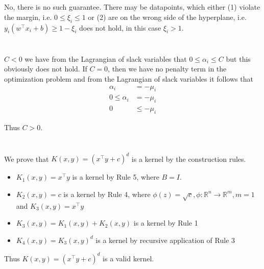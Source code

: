 \documentclass[11pt]{article}
\newcommand{\exercise}{\section{}}
\newcommand{\tf}[1]{{#1}^{\intercal}}
\begin{document}
\exercise

No, there is no such guarantee. There may be datapoints, which either (1) violate the margin, i.e. $0 \le \xi_i \le 1$ or (2) are on the wrong side of the hyperplane, i.e. $y_i (\tf{w} x_i + b) \ge 1 - \xi_i$ does not hold, in this case $\xi_i > 1$.

\exercise

$C < 0$ we have from the Lagrangian of slack variables that $0 \le \alpha_i \le C$ but this obviously does not hold. If $ C = 0$, then we have no penalty term in the optimization problem and from the Lagrangian of slack variables it follows that
\begin{align*}
\alpha_i &= - \mu_i \\
0 \le \alpha_i &= - \mu_i \\
0 &\le -\mu_i  \tag{violation of dual feasibility of Lagrangian multipliers $\mu_i \ge 0$ }
\end{align*}

\noindent Thus $C > 0$.

\exercise

We prove that $ K(x,y) = ( \tf{x} y + c)^d $ is a kernel by the construction rules.

\begin{itemize}
\item $K_1(x, y) = \tf{x} y$ is a kernel by Rule 5, where $B = I$.
\item $K_2(x, y) = c$ is a kernel by Rule 4, where $ \phi(z) = \sqrt{c}, \phi : \mathbb{R}^n \rightarrow \mathbb{R}^m, m = 1$ and $K_3(x, y) = \tf{x} y $
\item $K_3(x, y) = K_1(x, y) + K_2(x, y)$ is a kernel by Rule 1
\item $K_4(x, y) = K_3(x, y)^d$ is a kernel by recursive application of Rule 3
\end{itemize}

Thus $ K(x,y) = ( \tf{x} y + c)^d $ is a valid kernel.

\exercise

\exercise

\exercise

\exercise
\end{document}
